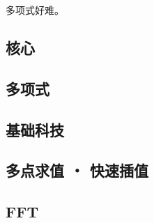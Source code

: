\documentclass{probook}
\begin{document}
\begin{multicols}{2}
多项式好难。

\subsection{核心}



\subsection{多项式}



\subsection{基础科技}



\subsection{多点求值 ・ 快速插值}



\subsection{FFT}











% 



\end{multicols}
\end{document}
